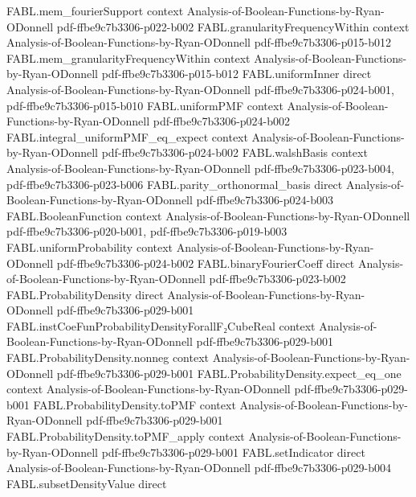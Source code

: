 \begin{theorem}
\proofstep
  {FABL.mem_fourierSupport}
  {context}
  {Analysis-of-Boolean-Functions-by-Ryan-ODonnell}
  {pdf-ffbe9c7b3306-p022-b002}
\proofstep
  {FABL.granularityFrequencyWithin}
  {context}
  {Analysis-of-Boolean-Functions-by-Ryan-ODonnell}
  {pdf-ffbe9c7b3306-p015-b012}
\proofstep
  {FABL.mem_granularityFrequencyWithin}
  {context}
  {Analysis-of-Boolean-Functions-by-Ryan-ODonnell}
  {pdf-ffbe9c7b3306-p015-b012}
\proofstep
  {FABL.uniformInner}
  {direct}
  {Analysis-of-Boolean-Functions-by-Ryan-ODonnell}
  {pdf-ffbe9c7b3306-p024-b001,
    pdf-ffbe9c7b3306-p015-b010}
\proofstep
  {FABL.uniformPMF}
  {context}
  {Analysis-of-Boolean-Functions-by-Ryan-ODonnell}
  {pdf-ffbe9c7b3306-p024-b002}
\proofstep
  {FABL.integral_uniformPMF_eq_expect}
  {context}
  {Analysis-of-Boolean-Functions-by-Ryan-ODonnell}
  {pdf-ffbe9c7b3306-p024-b002}
\proofstep
  {FABL.walshBasis}
  {context}
  {Analysis-of-Boolean-Functions-by-Ryan-ODonnell}
  {pdf-ffbe9c7b3306-p023-b004,
    pdf-ffbe9c7b3306-p023-b006}
\proofstep
  {FABL.parity_orthonormal_basis}
  {direct}
  {Analysis-of-Boolean-Functions-by-Ryan-ODonnell}
  {pdf-ffbe9c7b3306-p024-b003}
\proofstep
  {FABL.BooleanFunction}
  {context}
  {Analysis-of-Boolean-Functions-by-Ryan-ODonnell}
  {pdf-ffbe9c7b3306-p020-b001,
    pdf-ffbe9c7b3306-p019-b003}
\proofstep
  {FABL.uniformProbability}
  {context}
  {Analysis-of-Boolean-Functions-by-Ryan-ODonnell}
  {pdf-ffbe9c7b3306-p024-b002}
\proofstep
  {FABL.binaryFourierCoeff}
  {direct}
  {Analysis-of-Boolean-Functions-by-Ryan-ODonnell}
  {pdf-ffbe9c7b3306-p023-b002}
\proofstep
  {FABL.ProbabilityDensity}
  {direct}
  {Analysis-of-Boolean-Functions-by-Ryan-ODonnell}
  {pdf-ffbe9c7b3306-p029-b001}
\proofstep
  {FABL.instCoeFunProbabilityDensityForallF₂CubeReal}
  {context}
  {Analysis-of-Boolean-Functions-by-Ryan-ODonnell}
  {pdf-ffbe9c7b3306-p029-b001}
\proofstep
  {FABL.ProbabilityDensity.nonneg}
  {context}
  {Analysis-of-Boolean-Functions-by-Ryan-ODonnell}
  {pdf-ffbe9c7b3306-p029-b001}
\proofstep
  {FABL.ProbabilityDensity.expect_eq_one}
  {context}
  {Analysis-of-Boolean-Functions-by-Ryan-ODonnell}
  {pdf-ffbe9c7b3306-p029-b001}
\proofstep
  {FABL.ProbabilityDensity.toPMF}
  {context}
  {Analysis-of-Boolean-Functions-by-Ryan-ODonnell}
  {pdf-ffbe9c7b3306-p029-b001}
\proofstep
  {FABL.ProbabilityDensity.toPMF_apply}
  {context}
  {Analysis-of-Boolean-Functions-by-Ryan-ODonnell}
  {pdf-ffbe9c7b3306-p029-b001}
\proofstep
  {FABL.setIndicator}
  {direct}
  {Analysis-of-Boolean-Functions-by-Ryan-ODonnell}
  {pdf-ffbe9c7b3306-p029-b004}
\proofstep
  {FABL.subsetDensityValue}
  {direct}

\end{theorem}
